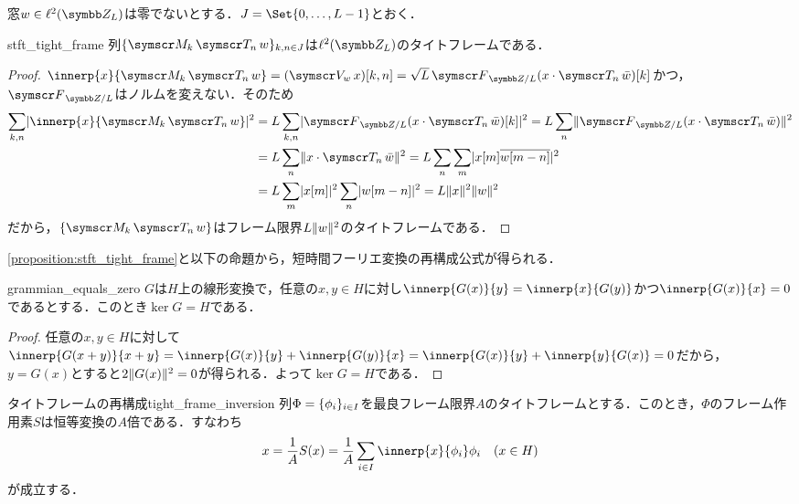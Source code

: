 \documentclass[../../main]{subfiles}
\begin{document}
窓\(w\in\cycles{L}\)は零でないとする．\(J=\Set{0,\dots,L-1}\)とおく．

\begin{proposition}{}{stft_tight_frame}
  列\(\seq{\modulate{k}\translate{n}w}_{k,n\in J}\)は\(\cycles{L}\)のタイトフレームである．
\end{proposition}

\begin{proof}
  \(\innerp{x}{\modulate{k}\translate{n}w}=(\stft{w}x)[k,n]=\sqrt{L}\dft{L}(x\cdot\translate{n}\conj{w})[k]\)かつ，\(\dft{L}\)はノルムを変えない．そのため
  \begin{align*}
    \sum_{k,n}\abs{\innerp{x}{\modulate{k}\translate{n}w}}^2 &= L\sum_{k,n}\abs{\dft{L}(x\cdot\translate{n}\conj{w})[k]}^2
    = L\sum_n\vnorm{\dft{L}(x\cdot\translate{n}\conj{w})}^2 \\
    &= L\sum_n\vnorm{x\cdot\translate{n}\conj{w}}^2
    = L\sum_n\sum_m\abs{x[m]\conj*{w[m-n]}}^2 \\
    &= L\sum_m\abs{x[m]}^2\sum_n\abs{w[m-n]}^2
    = L\vnorm{x}^2\vnorm{w}^2
  \end{align*}
  だから，\(\seq{\modulate{k}\translate{n}w}\)はフレーム限界\(L\lVert w\rVert^2\)のタイトフレームである．
\end{proof}

\cref{proposition:stft_tight_frame}と以下の命題から，短時間フーリエ変換の再構成公式が得られる．

\begin{lemma}{}{grammian_equals_zero}
  \(G\)は\(H\)上の線形変換で，任意の\(x,y\in H\)に対し\(\innerp{G(x)}{y}=\innerp{x}{G(y)}\)かつ\(\innerp{G(x)}{x}=0\)であるとする．このとき\(\ker G=H\)である．
\end{lemma}

\begin{proof}
  任意の\(x,y\in H\)に対して\(\innerp{G(x+y)}{x+y}=\innerp{G(x)}{y}+\innerp{G(y)}{x}=\innerp{G(x)}{y}+\innerp{y}{G(x)}=0\)だから，
  \(y=G(x)\)とすると\(2\lVert G(x)\rVert^2=0\)が得られる．よって\(\ker G=H\)である．
\end{proof}

\begin{proposition}{タイトフレームの再構成}{tight_frame_inversion}
  列\(\Phi=\lbrace\phi_i\rbrace_{i\in I}\)を最良フレーム限界\(A\)のタイトフレームとする．このとき，\(\Phi\)のフレーム作用素\(S\)は恒等変換の\(A\)倍である．すなわち
  \[
    x = \frac{1}{A}S(x)
    = \frac{1}{A}\sum_{i\in I}\innerp{x}{\phi_i}\phi_i\quad(x\in H)
  \]
  が成立する．
\end{proposition}
\end{document}

